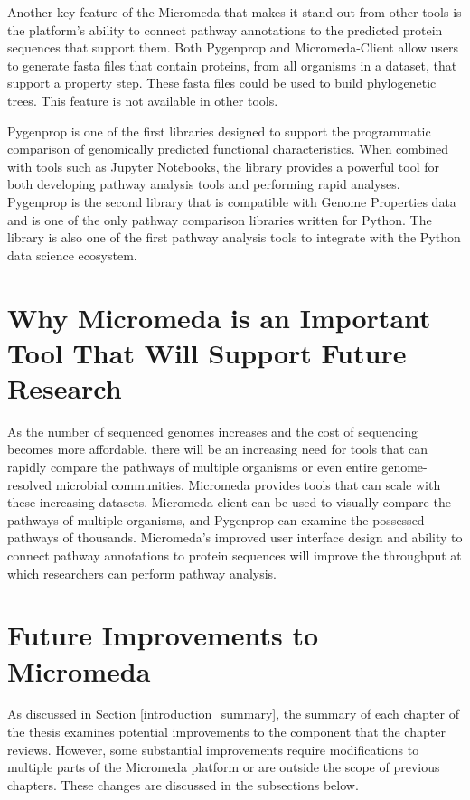 Another key feature of the Micromeda that makes it stand out from other 
tools is the platform's ability to connect pathway annotations to the predicted protein 
sequences that support them. Both Pygenprop and Micromeda-Client allow users to 
generate \gls{fasta} files that contain proteins, from all organisms in a dataset, 
that support a property step. These \gls{fasta} files could be used to build 
phylogenetic trees. This feature is not available in other tools.

Pygenprop is one of the first libraries designed to support the programmatic 
comparison of genomically predicted functional characteristics. When combined 
with tools such as Jupyter Notebooks, the library provides a powerful tool for 
both developing pathway analysis tools and performing rapid analyses. Pygenprop 
is the second library that is compatible with Genome Properties data and is one 
of the only pathway comparison libraries written for Python. The library is also one 
of the first pathway analysis tools to integrate with the Python data science 
ecosystem.

\section{Why Micromeda is an Important Tool That Will Support Future Research}

As the number of sequenced genomes increases and the cost of sequencing becomes 
more affordable, there will be an increasing need for tools that can rapidly 
compare the pathways of multiple organisms or even entire genome-resolved 
microbial communities. Micromeda provides tools that can scale with these 
increasing datasets. Micromeda-client can be used to visually compare the 
pathways of multiple organisms, and Pygenprop can examine the possessed pathways 
of thousands. Micromeda's improved user interface design and ability to connect 
pathway annotations to protein sequences will improve the throughput at which
researchers can perform pathway analysis.

\section{Future Improvements to Micromeda}

As discussed in Section \ref{introduction_summary}, the summary of each chapter 
of the thesis examines potential improvements to the component that the chapter 
reviews. However, some substantial improvements require modifications to 
multiple parts of the Micromeda platform or are outside the scope of previous 
chapters. These changes are discussed in the subsections below.

